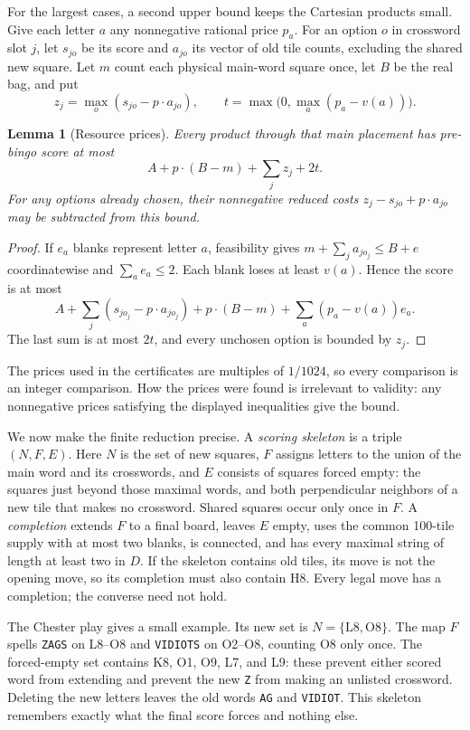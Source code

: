 \documentclass{article}
\theoremstyle{plain}
\newtheorem{lemma}[theorem]{Lemma}
\newcommand{\word}[1]{\texttt{#1}}
\begin{document}
For the largest cases, a second upper bound keeps the Cartesian products small.
Give each letter $a$ any nonnegative rational price $p_a$. For an option $o$ in
crossword slot $j$, let $s_{jo}$ be its score and $a_{jo}$ its vector of old
tile counts, excluding the shared new square. Let $m$ count each physical
main-word square once, let $B$ be the real bag, and put
\[
 z_j=\max_o(s_{jo}-p\cdot a_{jo}),\qquad
 t=\max\bigl(0,\max_a(p_a-v(a))\bigr).
\]

\begin{lemma}[Resource prices]\label{lem:prices}
Every product through that main placement has pre-bingo score at most
\[
 A+p\cdot(B-m)+\sum_jz_j+2t.
\]
For any options already chosen, their nonnegative reduced costs
$z_j-s_{jo}+p\cdot a_{jo}$ may be subtracted from this bound.
\end{lemma}
\begin{proof}
If $e_a$ blanks represent letter $a$, feasibility gives
$m+\sum_j a_{jo_j}\le B+e$ coordinatewise and $\sum_a e_a\le2$. Each blank
loses at least $v(a)$. Hence the score is at most
\[
 A+\sum_j(s_{jo_j}-p\cdot a_{jo_j})+p\cdot(B-m)
   +\sum_a(p_a-v(a))e_a.
\]
The last sum is at most $2t$, and every unchosen option is bounded by $z_j$.
\end{proof}

The prices used in the certificates are multiples of $1/1024$, so every
comparison is an integer comparison. How the prices were found is irrelevant
to validity: any nonnegative prices satisfying the displayed inequalities give
the bound.

We now make the finite reduction precise. A \emph{scoring skeleton} is a triple
$(N,F,E)$. Here $N$ is the set of new squares, $F$ assigns letters to the
union of the main word and its crosswords, and $E$ consists of squares forced
empty: the squares just beyond those maximal words, and both perpendicular
neighbors of a new tile that makes no crossword. Shared squares occur only once
in $F$. A \emph{completion} extends $F$ to a final board, leaves $E$ empty,
uses the common 100-tile supply with at most two blanks, is connected, and has
every maximal string of length at least two in $D$. If the skeleton contains
old tiles, its move is not the opening move, so its completion must also contain
H8. Every legal move has a completion; the converse need not hold.

The Chester play gives a small example. Its new set is
$N=\{\mathrm{L8},\mathrm{O8}\}$. The map $F$ spells \word{ZAGS} on L8--O8
and \word{VIDIOTS} on O2--O8, counting O8 only once. The forced-empty set
contains K8, O1, O9, L7, and L9: these prevent either scored word from
extending and prevent the new \word{Z} from making an unlisted crossword.
Deleting the new letters leaves the old words \word{AG} and \word{VIDIOT}.
This skeleton remembers exactly what the final score forces and nothing else.
\end{document}

